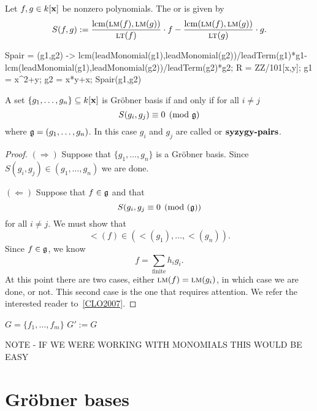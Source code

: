 \documentclass{ximera}
\begin{document}
\begin{definition}
  Let $f,g\in k[\mathbf{x}]$ be nonzero polynomials. The  or
   is given by
  \[
  S(f,g) := \frac{\operatorname{lcm}(\textsc{lm}(f),\textsc{lm}(g))}{\textsc{lt}(f)}\cdot f - \frac{\operatorname{lcm}(\textsc{lm}(f),\textsc{lm}(g))}{\textsc{lt}(g)}\cdot g.
  \]
\end{definition}

\begin{macaulay2}
Spair = (g1,g2) ->
lcm(leadMonomial(g1),leadMonomial(g2))/leadTerm(g1)*g1-
lcm(leadMonomial(g1),leadMonomial(g2))/leadTerm(g2)*g2;
R = ZZ/101[x,y];
g1 = x^2+y;
g2 = x*y+x;
Spair(g1,g2)
\end{macaulay2}





\begin{theorem}
  A set $\{g_1,\dots,g_n\}\subseteq k[\mathbf{x}]$ is Gr\"obner basis if and
  only if for all $i\ne j$
  \[
  S(g_i,g_j) \equiv 0 \pmod{\mathfrak g}
  \]
  where $\mathfrak g = (g_1,\dots,g_n)$. In this case $g_i$ and $g_j$ are
  called  or $\dfn{syzygy-pairs}$.
  \begin{proof}
    $(\Rightarrow)$ Suppose that $\{g_1,\dots,g_n\}$ is a Gr\"obner
    basis. Since $S(g_i,g_j)\in (g_1,\dots,g_n)$ we are done.

    $(\Leftarrow)$ Suppose that $f\in \mathfrak g$ and that
    \[
    S(g_i,g_j \equiv 0 \pmod{(\mathfrak g})
    \]
    for all $i\ne j$. We must show that
    \[
    \lt(f) \in (\lt(g_1),\dots, \lt(g_n)).
    \]
    Since $f\in \mathfrak g$, we know
    \[
    f = \sum_{\mathrm{finite}} h_i g_i.
    \]
    At this point there are two cases, either $\textsc{lm}(f) = \textsc{lm}(g_i)$, in
    which case we are done, or not. This second case is the one that
    requires attention. We refer the interested reader
    to~\ref{CLO2007}.
  \end{proof}
\end{theorem}




\begin{algorithm}
  \hfill
  \begin{algorithmic}[1]
    \State $G = \{f_1,\dots,f_m\}$
    \Repeat
    \State $G':=G$
    \EndProcedure
  \end{algorithmic}
\end{algorithm}


NOTE - IF WE WERE WORKING WITH MONOMIALS THIS WOULD BE EASY



\section{Gr\"obner bases}
\end{document}
